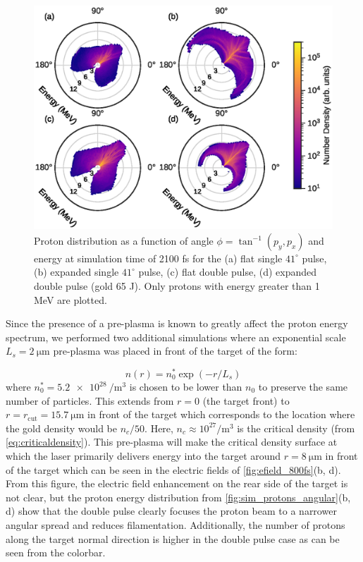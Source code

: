 \begin{figure}
	\centering
	\includegraphics[width=0.9\linewidth]{planning/images/titan/proton_angular_density_2100fs.eps}
	\caption{Proton distribution as a function of angle $\phi = \tan^{-1}(p_y, p_x)$ and energy at simulation time of 2100 fs for the (a) flat single $41^\circ$ pulse, (b) expanded single $41^\circ$ pulse, (c) flat double pulse, (d) expanded double pulse (gold 65 J). Only protons with energy greater than 1 MeV are plotted. }
	\label{fig:sim_protons_angular}
\end{figure}

Since the presence of a pre-plasma is known to greatly affect the proton energy spectrum, we performed two additional simulations where an exponential scale $L_s = \SI{2}{\micro \meter}$ pre-plasma was placed in front of the target of the form: 

\begin{equation}
	n(r) = n_0^* \exp(-r / L_s) \label{eq:exponential_scale_pp}
\end{equation}
where $n_0^* = \SI{5.2e28}{\per \meter \cubed}$ is chosen to be lower than $n_0$ to preserve the same number of particles. This extends from $r=0$ (the target front) to $r = r_\text{cut} = \SI{15.7}{\micro \meter}$ in front of the target which corresponds to the location where the gold density would be $n_c / 50$. Here, $n_c \approx 10^{27} \unit{\per \meter \cubed}$ is the critical density (from \autoref{eq:criticaldensity}). This pre-plasma will make the critical density surface at which the laser primarily delivers energy into the target around $r = \SI{8}{\micro \meter}$ in front of the target which can be seen in the electric fields of \autoref{fig:efield_800fs}(b, d). From this figure, the electric field enhancement on the rear side of the target is not clear, but the proton energy distribution from \autoref{fig:sim_protons_angular}(b, d) show that the double pulse clearly focuses the proton beam to a narrower angular spread and reduces filamentation. Additionally, the number of protons along the target normal direction is higher in the double pulse case as can be seen from the colorbar. 

